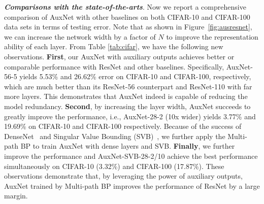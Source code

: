 \documentclass[10pt,onecolumn,letterpaper]{article}
\def\SexyName{AuxNet\xspace}
\begin{document}
\noindent \emph{\textbf{Comparisons with the state-of-the-arts}}.
Now we report a comprehensive comparison of \SexyName with other baselines on both CIFAR-10 and CIFAR-100 data sets in terms of testing error.
Note that as shown in Figure~\ref{fig:ausresnet}, we can increase the network width by a factor of $N$ to improve the representation ability of each layer.
From Table \ref{tab:cifar}, we have the following new observations. \textbf{First}, our \SexyName with auxiliary outputs achieves better or comparable performance with ResNet and other baselines. Specifically, \SexyName-56-5 yields 5.53\% and 26.62\% error on CIFAR-10 and CIFAR-100, respectively, which are much better than its ResNet-56 counterpart and ResNet-110 with far more layers. This demonstrates that \SexyName indeed is capable of reducing the model redundancy.
\textbf{Second}, by increasing the layer width, \SexyName succeeds to greatly improve the performance, i.e., \SexyName-28-2 (10x wider) yields 3.77\% and 19.69\% on CIFAR-10 and CIFAR-100 respectively.
Because of the success of DenseNet~\cite{huang2016densely} and Singular Value Bounding (SVB)~\cite{jia2016improving}, we further apply the Multi-path BP to train \SexyName with dense layers and SVB. \textbf{Finally}, we further improve the performance and \SexyName-SVB-28-2/10 achieve the best performance simultaneously on CIFAR-10 (3.32\%) and CIFAR-100 (17.87\%).
These observations demonstrate that, by leveraging the power of auxiliary outputs, \SexyName trained by Multi-path BP improves the performance of ResNet by a large margin.
\end{document}
